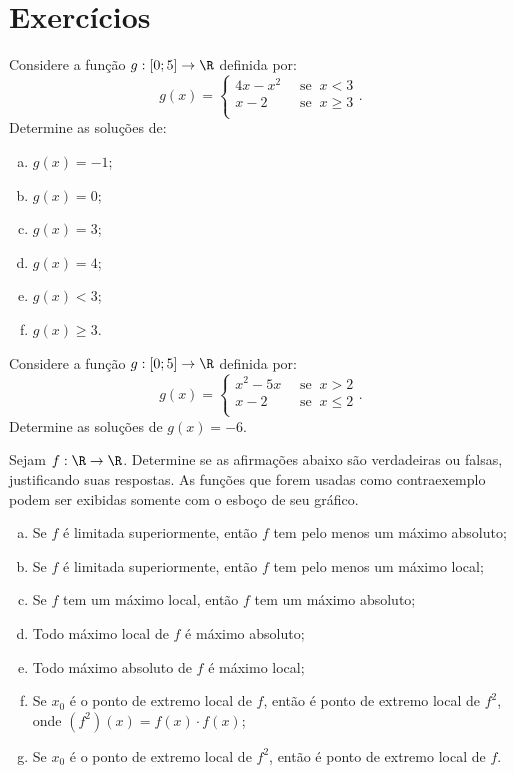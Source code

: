\section{Exercícios}

\begin{exercise}
  Considere a função $g: [0 ; 5] \to \R$ definida por: $$g(x) =
                                \begin{cases}
                                4x-x^2 & \ \text{ se } \ x< 3 \\
                                x-2 & \ \text{ se } \  x \geq 3 \\
                                \end{cases}.$$
Determine as soluções de:
\begin{enumerate}[(a)]
  \item $g(x) = -1$;
  \item $g(x) = 0$;
  \item $g(x) = 3$;
  \item $g(x) = 4$;
  \item $g(x) < 3$;
  \item $g(x) \geq 3$.
\end{enumerate}
\end{exercise}

\begin{exercise}
  Considere a função $g: [0 ; 5] \to \R$ definida por: $$g(x) =
                                \begin{cases}
                                x^2-5x & \ \text{ se } \ x> 2 \\
                                x-2 & \ \text{ se } \  x \leq 2 \\
                                \end{cases}.$$
Determine as soluções de $g(x) = -6$.
\end{exercise}

\begin{exercise}
Sejam $f: \R \to \R $. Determine se as afirmações abaixo são
verdadeiras ou falsas, justificando suas respostas. As funções que
forem usadas como contraexemplo podem ser exibidas somente com o
esboço de seu gráfico.
\begin{enumerate}[(a)]
  \item Se $f$ é limitada superiormente, então $f$ tem pelo menos um máximo absoluto;
  \item Se $f$ é limitada superiormente, então $f$ tem pelo menos um máximo local;
  \item Se $f$ tem um máximo local, então $f$ tem um máximo absoluto;
  \item Todo máximo local de $f$ é máximo absoluto;
  \item Todo máximo absoluto de $f$ é máximo local;
  \item Se $x_0$ é o ponto de extremo local de $f$, então é ponto de
  extremo local de $f^2$, onde $(f^2)(x) = f(x) \cdot f(x)$;
  \item Se $x_0$ é o ponto de extremo local de $f^2$, então é ponto de
  extremo local de $f$.
\end{enumerate}
\end{exercise}

